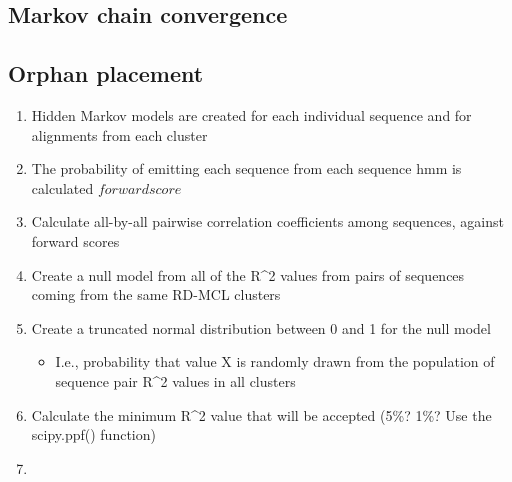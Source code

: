 \documentclass[twocolumn]{bmcart}%
\begin{document}
\subsection{Markov chain convergence}\label{subsec:markovChainConvergence}
\lipsum[3]


\subsection{Orphan placement}\label{subsec:orphanPlacement}
\begin{enumerate}
  \item Hidden Markov models are created for each individual sequence and for alignments from each cluster
  \item The probability of emitting each sequence from each sequence hmm is calculated \(forward score\)
  \item Calculate all-by-all pairwise correlation coefficients among sequences, against forward scores
  \item Create a null model from all of the R\textasciicircum2 values from pairs of sequences coming from the same RD-MCL clusters
  \item Create a truncated normal distribution between 0 and 1 for the null model
    \begin{itemize}
    \item I.e., probability that value X is randomly drawn from the population of sequence pair R\textasciicircum2 values in all clusters
    \end{itemize}
  \item Calculate the minimum R\textasciicircum2 value that will be accepted (5\%? 1\%? Use the scipy.ppf() function)
  \item
\end{enumerate}


\end{document}
